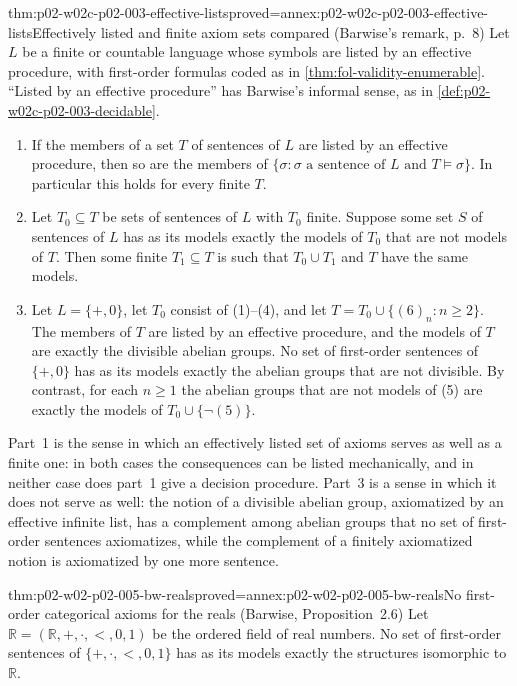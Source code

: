 \begin{hbtheorem}{thm:p02-w02c-p02-003-effective-lists}{proved=annex:p02-w02c-p02-003-effective-lists}{Effectively listed and finite axiom sets compared (Barwise's remark, p.~8)}
Let \(L\) be a finite or countable language whose symbols are listed by an
effective procedure, with first-order formulas coded as in
\cref{thm:fol-validity-enumerable}.  ``Listed by an effective procedure''
has Barwise's informal sense, as in
\cref{def:p02-w02c-p02-003-decidable}.
\begin{enumerate}
\item If the members of a set \(T\) of sentences of \(L\) are listed by an
      effective procedure, then so are the members of
      \(\{\sigma:\sigma\text{ a sentence of }L\text{ and }T\models\sigma\}\).
      In particular this holds for every finite \(T\).
\item Let \(T_0\subseteq T\) be sets of sentences of \(L\) with \(T_0\)
      finite.  Suppose some set \(S\) of sentences of \(L\) has as its
      models exactly the models of \(T_0\) that are not models of \(T\).
      Then some finite \(T_1\subseteq T\) is such that \(T_0\cup T_1\) and
      \(T\) have the same models.
\item Let \(L=\{+,0\}\), let \(T_0\) consist of (1)--(4), and let
      \(T=T_0\cup\{(6)_n:n\geq2\}\).  The members of \(T\) are listed by an
      effective procedure, and the models of \(T\) are exactly the
      divisible abelian groups.  No set of first-order sentences of
      \(\{+,0\}\) has as its models exactly the abelian groups that are
      not divisible.  By contrast, for each \(n\geq1\) the abelian groups
      that are not models of (5) are exactly the models of
      \(T_0\cup\{\neg(5)\}\).
\end{enumerate}
\end{hbtheorem}

Part~1 is the sense in which an effectively listed set of axioms serves as
well as a finite one: in both cases the consequences can be listed
mechanically, and in neither case does part~1 give a decision procedure.
Part~3 is a sense in which it does not serve as well: the notion of a
divisible abelian group, axiomatized by an effective infinite list, has a
complement among abelian groups that no set of first-order sentences
axiomatizes, while the complement of a finitely axiomatized notion is
axiomatized by one more sentence.

\begin{hbtheorem}{thm:p02-w02-p02-005-bw-reals}{proved=annex:p02-w02-p02-005-bw-reals}{No first-order categorical axioms for the reals (Barwise, Proposition~2.6)}
Let \(\mathbb R=(\mathbb R,+,\cdot,<,0,1)\) be the ordered field of real
numbers.  No set of first-order sentences of \(\{+,\cdot,<,0,1\}\) has as
its models exactly the structures isomorphic to \(\mathbb R\).
\end{hbtheorem}

